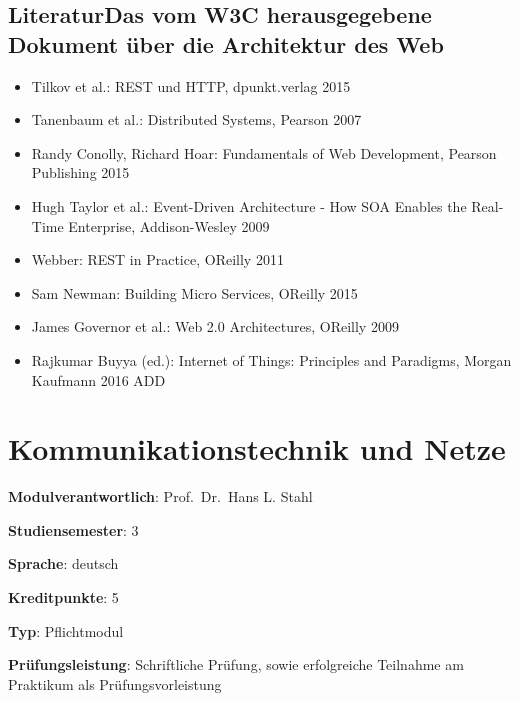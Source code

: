 \hypertarget{literaturdas-vom-w3c-herausgegebene-dokument-uxfcber-die-architektur-des-webpathlabelmi-2017modulbeschreibungen-bachelorba_grundlagen-des-web}{%
\section*{LiteraturDas vom W3C herausgegebene Dokument über die
Architektur des
Web\label{/mi-2017/modulbeschreibungen-bachelor/BA_Grundlagen-des-web}}\label{literaturdas-vom-w3c-herausgegebene-dokument-uxfcber-die-architektur-des-webpathlabelmi-2017modulbeschreibungen-bachelorba_grundlagen-des-web}}

\begin{itemize}
\tightlist
\item
  Tilkov et al.: REST und HTTP, dpunkt.verlag 2015
\item
  Tanenbaum et al.: Distributed Systems, Pearson 2007
\item
  Randy Conolly, Richard Hoar: Fundamentals of Web Development, Pearson
  Publishing 2015
\item
  Hugh Taylor et al.: Event-Driven Architecture - How SOA Enables the
  Real-Time Enterprise, Addison-Wesley 2009
\item
  Webber: REST in Practice, OReilly 2011
\item
  Sam Newman: Building Micro Services, OReilly 2015
\item
  James Governor et al.: Web 2.0 Architectures, OReilly 2009
\item
  Rajkumar Buyya (ed.): Internet of Things: Principles and Paradigms,
  Morgan Kaufmann 2016 ADD
\end{itemize}

\hypertarget{kommunikationstechnik-und-netzepathlabelmi-2017modulbeschreibungen-bachelorba_kommunikationstechnikundnetze}{%
\chapter{Kommunikationstechnik und
Netze\label{/mi-2017/modulbeschreibungen-bachelor/BA_KommunikationstechnikundNetze}}\label{kommunikationstechnik-und-netzepathlabelmi-2017modulbeschreibungen-bachelorba_kommunikationstechnikundnetze}}

\begin{modulHead}
\textbf{Modulverantwortlich}: Prof.~Dr.~Hans L.
Stahl
\end{modulHead}
\begin{modulHead}
\textbf{Studiensemester}:
3
\end{modulHead}
\begin{modulHead}
\textbf{Sprache}:
deutsch
\end{modulHead}
\begin{modulHead}
\textbf{Kreditpunkte}:
5
\end{modulHead}
\begin{modulHead}
\textbf{Typ}:
Pflichtmodul
\end{modulHead}
\begin{modulHead}
\textbf{Prüfungsleistung}:
Schriftliche Prüfung, sowie erfolgreiche Teilnahme am Praktikum als
Prüfungsvorleistung
\end{modulHead}


